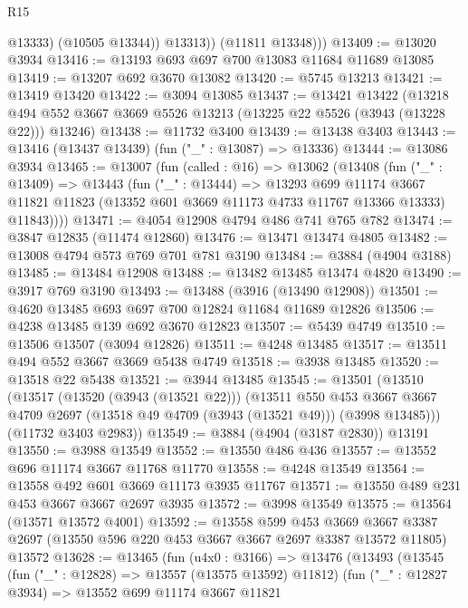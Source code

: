 \begin{lexlean}{R15}
\begin{coremodule}
                @13333)
              (@10505 @13344))
            @13313))
        (@11811 @13348)))
@13409 := @13020 @3934
@13416 := @13193 @693 @697 @700 @13083 @11684 @11689 @13085
@13419 := @13207 @692 @3670 @13082
@13420 := @5745 @13213
@13421 := @13419 @13420
@13422 := @3094 @13085
@13437 := @13421
    @13422
    (@13218 @494 @552 @3667 @3669 @5526 @13213 (@13225 @22 @5526 (@3943 (@13228 @22))) @13246)
@13438 := @11732 @3400
@13439 := @13438 @3403
@13443 := @13416 (@13437 @13439) (fun ("_" : @13087) => @13336)
@13444 := @13086 @3934
@13465 := @13007
    (fun (called : @16) =>
    @13062
      (@13408
        (fun ("_" : @13409) =>
        @13443
          (fun ("_" : @13444) =>
          @13293
            @699
            @11174
            @3667
            @11821
            @11823
            (@13352 @601 @3669 @11173 @4733 @11767 @13366 @13333)
            @11843))))
@13471 := @4054 @12908 @4794 @486 @741 @765 @782
@13474 := @3847 @12835 (@11474 @12860)
@13476 := @13471 @13474 @4805
@13482 := @13008 @4794 @573 @769 @701 @781 @3190
@13484 := @3884 (@4904 @3188)
@13485 := @13484 @12908
@13488 := @13482 @13485 @13474 @4820
@13490 := @3917 @769 @3190
@13493 := @13488 (@3916 (@13490 @12908))
@13501 := @4620 @13485 @693 @697 @700 @12824 @11684 @11689 @12826
@13506 := @4238 @13485 @139 @692 @3670 @12823
@13507 := @5439 @4749
@13510 := @13506 @13507 (@3094 @12826)
@13511 := @4248 @13485
@13517 := @13511 @494 @552 @3667 @3669 @5438 @4749
@13518 := @3938 @13485
@13520 := @13518 @22 @5438
@13521 := @3944 @13485
@13545 := @13501
    (@13510
      (@13517
        (@13520 (@3943 (@13521 @22)))
        (@13511
          @550
          @453
          @3667
          @3667
          @4709
          @2697
          (@13518 @49 @4709 (@3943 (@13521 @49)))
          (@3998 @13485)))
      (@11732 @3403 @2983))
@13549 := @3884 (@4904 (@3187 @2830)) @13191
@13550 := @3988 @13549
@13552 := @13550 @486 @436
@13557 := @13552 @696 @11174 @3667 @11768 @11770
@13558 := @4248 @13549
@13564 := @13558 @492 @601 @3669 @11173 @3935 @11767
@13571 := @13550 @489 @231 @453 @3667 @3667 @2697 @3935
@13572 := @3998 @13549
@13575 := @13564 (@13571 @13572 @4001)
@13592 := @13558
    @599
    @453
    @3669
    @3667
    @3387
    @2697
    (@13550 @596 @220 @453 @3667 @3667 @2697 @3387 @13572 @11805)
    @13572
@13628 := @13465
    (fun (u4x0 : @3166) =>
    @13476
      (@13493
        (@13545
          (fun ("_" : @12828) => @13557 (@13575 @13592) @11812)
          (fun ("_" : @12827 @3934) =>
          @13552
            @699
            @11174
            @3667
            @11821

\end{coremodule}
\end{lexlean}
